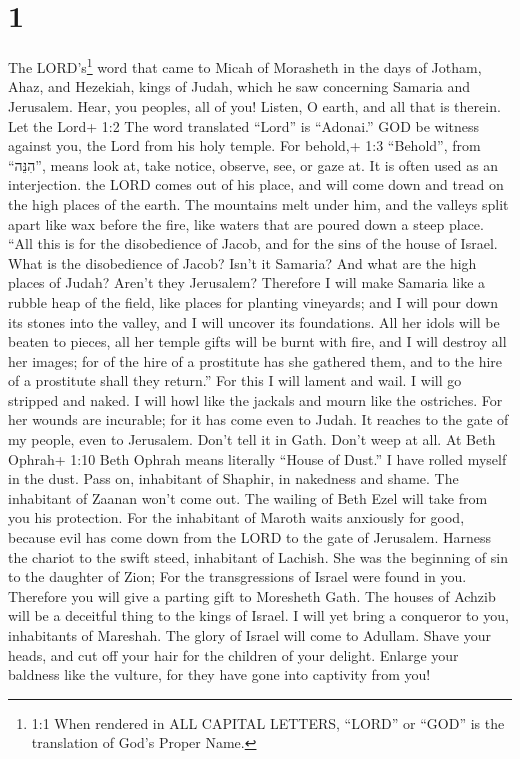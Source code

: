 \hypertarget{section}{%
\section{1}\label{section}}

 The LORD's\footnote{1:1 When rendered in ALL CAPITAL
  LETTERS, ``LORD'' or ``GOD'' is the translation of God's Proper Name.}
word that came to Micah of Morasheth in the days of Jotham, Ahaz, and
Hezekiah, kings of Judah, which he saw concerning Samaria and Jerusalem.
 Hear, you peoples, all of you! Listen, O earth, and all
that is therein. Let the Lord+ 1:2 The word translated ``Lord'' is
``Adonai.'' GOD be witness against you, the Lord from his holy temple.
 For behold,+ 1:3 ``Behold'', from ``הִנֵּה'', means look
at, take notice, observe, see, or gaze at. It is often used as an
interjection. the LORD comes out of his place, and will come down and
tread on the high places of the earth.  The mountains melt
under him, and the valleys split apart like wax before the fire, like
waters that are poured down a steep place.  ``All this is
for the disobedience of Jacob, and for the sins of the house of Israel.
What is the disobedience of Jacob? Isn't it Samaria? And what are the
high places of Judah? Aren't they Jerusalem?  Therefore I
will make Samaria like a rubble heap of the field, like places for
planting vineyards; and I will pour down its stones into the valley, and
I will uncover its foundations.  All her idols will be
beaten to pieces, all her temple gifts will be burnt with fire, and I
will destroy all her images; for of the hire of a prostitute has she
gathered them, and to the hire of a prostitute shall they return.''
 For this I will lament and wail. I will go stripped and
naked. I will howl like the jackals and mourn like the ostriches.
 For her wounds are incurable; for it has come even to
Judah. It reaches to the gate of my people, even to Jerusalem.
 Don't tell it in Gath. Don't weep at all. At Beth Ophrah+
1:10 Beth Ophrah means literally ``House of Dust.'' I have rolled myself
in the dust.  Pass on, inhabitant of Shaphir, in nakedness
and shame. The inhabitant of Zaanan won't come out. The wailing of Beth
Ezel will take from you his protection.  For the inhabitant
of Maroth waits anxiously for good, because evil has come down from the
LORD to the gate of Jerusalem.  Harness the chariot to the
swift steed, inhabitant of Lachish. She was the beginning of sin to the
daughter of Zion; For the transgressions of Israel were found in you.
 Therefore you will give a parting gift to Moresheth Gath.
The houses of Achzib will be a deceitful thing to the kings of Israel.
 I will yet bring a conqueror to you, inhabitants of
Mareshah. The glory of Israel will come to Adullam.  Shave
your heads, and cut off your hair for the children of your delight.
Enlarge your baldness like the vulture, for they have gone into
captivity from you!

